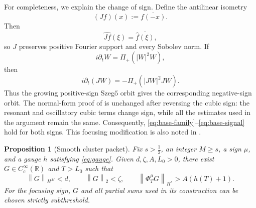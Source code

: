 \documentclass[11pt,reqno]{amsart}
\numberwithin{equation}{section}
\newtheorem{proposition}[theorem]{Proposition}
\theoremstyle{remark}
\newcommand{\R}{\mathbb R}
\newcommand{\half}{\frac12}
\newcommand{\norm}[1]{\left\lVert #1\right\rVert}
\newcommand{\flow}[1]{\Phi^{#1}}
\begin{document}
For completeness, we explain the change of sign.  Define the antilinear
isometry
\[
 (Jf)(x):=\overline{f(-x)}.
\]
Then
\[
 \widehat{Jf}(\xi)=\overline{\widehat f(\xi)},
\]
so $J$ preserves positive Fourier support and every Sobolev norm.  If
\[
 i\partial_tW=\Pi_+(|W|^2W),
\]
then
\[
 i\partial_t(JW)=-\Pi_+(|JW|^2JW).
\]
Thus the growing positive-sign Szeg\H{o} orbit gives the corresponding
negative-sign orbit.  The normal-form proof of
\cite[Theorem~1.2]{PocovnicuApprox} is unchanged after reversing the cubic
sign: the resonant and oscillatory cubic terms change sign, while all the
estimates used in the argument remain the same.  Consequently,
\eqref{eq:base-family}--\eqref{eq:base-signal} hold for both signs.  This
focusing modification is also noted in \cite[footnote~1]{GLPR}.
\begin{proposition}[Smooth cluster packet]\label{prop:cluster}
Fix $s>\half$, an integer $M\geq s$, a sign $\mu$, and a gauge $h$ satisfying
\eqref{eq:gauge}.  Given $d,\zeta,A,L_0>0$, there exist
$G\in C_c^\infty(\R)$ and $T>L_0$ such that
\begin{equation}\label{eq:cluster-properties}
 \norm G_{H^M}<d,
 \qquad
 \norm G_2<\zeta,
 \qquad
 \norm{\flow\mu_TG}_{H^s}>A(h(T)+1).
\end{equation}
For the focusing sign, $G$ and all partial sums used in its construction can
be chosen strictly subthreshold.
\end{proposition}
\end{document}
